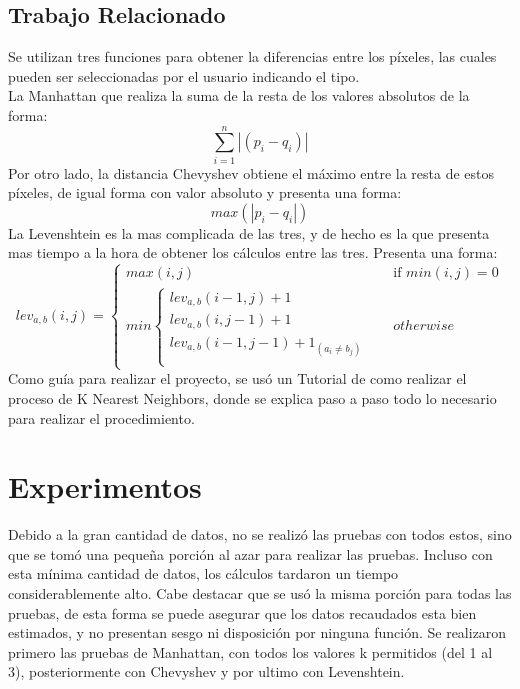 \documentclass{article}
\begin{document}
\subsection{Trabajo Relacionado}
Se utilizan tres funciones para obtener la diferencias entre los píxeles, las cuales pueden ser seleccionadas por el usuario indicando el tipo.
\\La Manhattan\cite{manhattan} que realiza la suma de la resta de los valores absolutos de la forma:
\begin{equation}
    \sum_{i=1}^{n}|(p_i - q_i)|
\end{equation}
Por otro lado, la distancia Chevyshev\cite{chevyshev} obtiene el máximo entre la resta de estos píxeles, de igual forma con valor absoluto y presenta una forma:
\begin{equation}
    max(|p_i - q_i|)
\end{equation}
La Levenshtein\cite{levenshtein} es la mas complicada de las tres, y de hecho es la que presenta mas tiempo a la hora de obtener los cálculos entre las tres. Presenta una forma:
\begin{equation}
 lev_{a,b} (i,j) =
  \begin{cases}
    max(i,j)       & \quad \text{if } min(i,j)=0\\
    min  \begin{cases}
        lev_{a,b}(i-1,j)+1\\
        lev_{a,b}(i,j-1)+1\\
        lev_{a,b}(i-1,j-1)+1_{(a_{i}\neq b_{j})}\\
        \end{cases} & \quad otherwise
  \end{cases}
\end{equation}
Como guía para realizar el proyecto, se usó un Tutorial\cite{tuto} de como realizar el proceso de K Nearest Neighbors, donde se explica paso a paso todo lo necesario para realizar el procedimiento.
\section{Experimentos} 
Debido a la gran cantidad de datos, no se realizó las pruebas con todos estos, sino que se tomó una pequeña porción al azar para realizar las pruebas. Incluso con esta mínima cantidad de datos, los cálculos tardaron un tiempo considerablemente alto. Cabe destacar que se usó la misma porción para todas las pruebas, de esta forma se puede asegurar que los datos recaudados esta bien estimados, y no presentan sesgo ni disposición por ninguna función. Se realizaron primero las pruebas de Manhattan, con todos los valores k permitidos (del 1 al 3), posteriormente con Chevyshev y por ultimo con Levenshtein.
\end{document}
